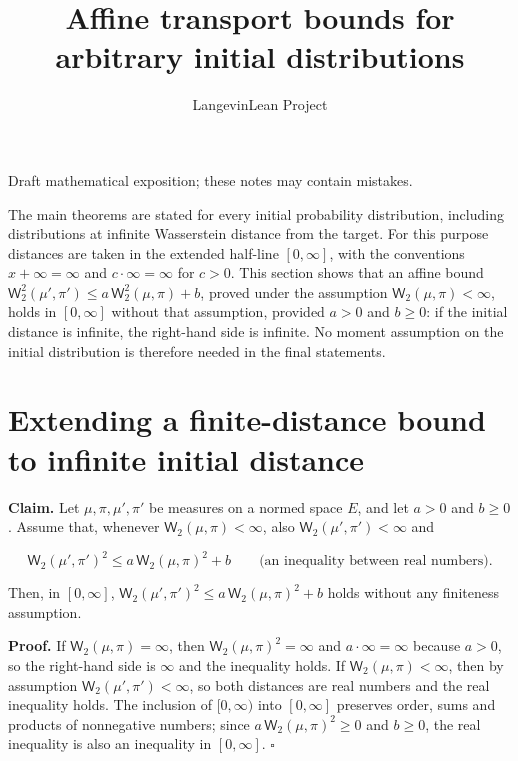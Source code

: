 \documentclass[11pt,a4paper]{article}
\title{\texorpdfstring{Affine transport bounds for arbitrary initial distributions}{Affine transport bounds for arbitrary initial distributions}}
\author{LangevinLean Project}
\date{}
\begin{document}
\maketitle
Draft mathematical exposition; these notes may contain mistakes.


The main theorems are stated for every initial probability distribution, including distributions at infinite Wasserstein distance from the target. For this purpose distances are taken in the extended half-line \([0,\infty]\), with the conventions \(x+\infty=\infty\) and \(c\cdot\infty=\infty\) for \(c>0\). This section shows that an affine bound \(\mathsf W_2^2(\mu',\pi')\le a\,\mathsf W_2^2(\mu,\pi)+b\), proved under the assumption \(\mathsf W_2(\mu,\pi)<\infty\), holds in \([0,\infty]\) without that assumption, provided \(a>0\) and \(b\ge0\): if the initial distance is infinite, the right-hand side is infinite. No moment assumption on the initial distribution is therefore needed in the final statements.


\section{\texorpdfstring{Extending a finite-distance bound to infinite initial distance}{Extending a finite-distance bound to infinite initial distance}}


\textbf{Claim.} Let \(\mu,\pi,\mu',\pi'\) be measures on a normed space \(E\), and let \(a>0\) and \(b\ge0\). Assume that, whenever \(\mathsf W_2(\mu,\pi)<\infty\), also \(\mathsf W_2(\mu',\pi')<\infty\) and


\[\mathsf W_2(\mu',\pi')^2\le a\,\mathsf W_2(\mu,\pi)^2+b\qquad\text{(an inequality between real numbers).}\]


Then, in \([0,\infty]\), \(\mathsf W_2(\mu',\pi')^2\le a\,\mathsf W_2(\mu,\pi)^2+b\) holds without any finiteness assumption.




\textbf{Proof.} If \(\mathsf W_2(\mu,\pi)=\infty\), then \(\mathsf W_2(\mu,\pi)^2=\infty\) and \(a\cdot\infty=\infty\) because \(a>0\), so the right-hand side is \(\infty\) and the inequality holds. If \(\mathsf W_2(\mu,\pi)<\infty\), then by assumption \(\mathsf W_2(\mu',\pi')<\infty\), so both distances are real numbers and the real inequality holds. The inclusion of \([0,\infty)\) into \([0,\infty]\) preserves order, sums and products of nonnegative numbers; since \(a\,\mathsf W_2(\mu,\pi)^2\ge0\) and \(b\ge0\), the real inequality is also an inequality in \([0,\infty]\). \(\square\)
\end{document}

